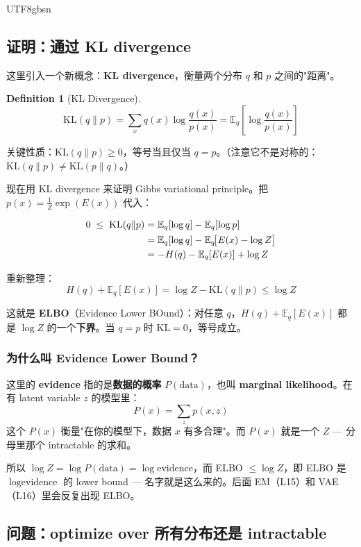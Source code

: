 \documentclass[11pt]{article}
\newtheorem{definition}{Definition}[section]
\begin{document}
\begin{CJK}{UTF8}{gbsn}
\subsection{证明：通过 KL divergence}

这里引入一个新概念：\textbf{KL divergence}，衡量两个分布 $q$ 和 $p$ 之间的"距离"。

\begin{definition}[KL Divergence]
\[
  \mathrm{KL}(q \| p) = \sum_x q(x) \log \frac{q(x)}{p(x)} = \mathbb{E}_q\!\left[\log \frac{q(x)}{p(x)}\right]
\]
\end{definition}

关键性质：$\mathrm{KL}(q\|p) \geq 0$，等号当且仅当 $q = p$。（注意它不是对称的：$\mathrm{KL}(q\|p) \neq \mathrm{KL}(p\|q)$。）

现在用 KL divergence 来证明 Gibbs variational principle。把 $p(x) = \frac{1}{Z}\exp(E(x))$ 代入：

\begin{align}
  0 \;\leq\; \mathrm{KL}(q \| p)
  &= \mathbb{E}_q[\log q] - \mathbb{E}_q[\log p] \notag \\
  &= \mathbb{E}_q[\log q] - \mathbb{E}_q\!\big[E(x) - \log Z\big] \notag \\
  &= -H(q) - \mathbb{E}_q[E(x)] + \log Z \notag
\end{align}

重新整理：
\[
  \boxed{H(q) + \mathbb{E}_q[E(x)] = \log Z - \mathrm{KL}(q\|p) \leq \log Z}
\]

这就是 \textbf{ELBO}（Evidence Lower BOund）：对任意 $q$，$H(q) + \mathbb{E}_q[E(x)]$ 都是 $\log Z$ 的一个\textbf{下界}。当 $q = p$ 时 $\mathrm{KL} = 0$，等号成立。

\subsubsection{为什么叫 Evidence Lower Bound？}

这里的 \textbf{evidence} 指的是\textbf{数据的概率} $P(\text{data})$，也叫 \textbf{marginal likelihood}。在有 latent variable $z$ 的模型里：
\[
  P(x) = \sum_z p(x, z)
\]
这个 $P(x)$ 衡量"在你的模型下，数据 $x$ 有多合理"。而 $P(x)$ 就是一个 $Z$ --- 分母里那个 intractable 的求和。

所以 $\log Z = \log P(\text{data}) = \log\text{evidence}$，而 ELBO $\leq \log Z$，即 ELBO 是 $\log\text{evidence}$ 的 lower bound --- 名字就是这么来的。后面 EM（L15）和 VAE（L16）里会反复出现 ELBO。

\subsection{问题：optimize over 所有分布还是 intractable}


\end{CJK}
\end{document}
